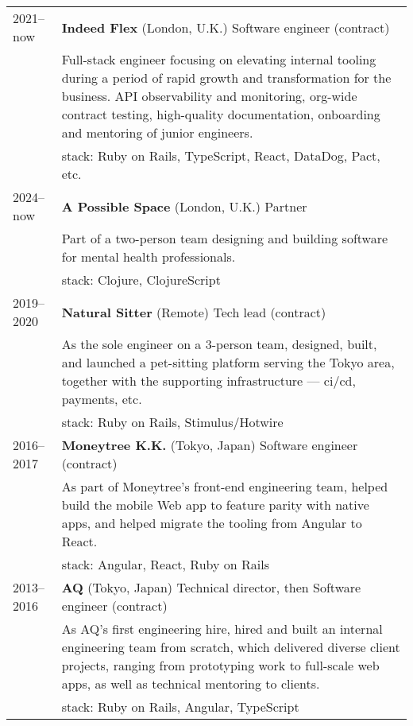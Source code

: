 \documentclass[a4paper,11pt]{article}
\def\companystrut{\rule{0pt}{1.2\normalbaselineskip}}
\def\descriptionstrut{\rule{0pt}{0.9\normalbaselineskip}}
\begin{document}
\begin{tabular}{ p{4.5em} p{41.5em} }
  2021–now & \textbf{Indeed Flex} (London, U.K.) Software engineer (contract)\\
           & \descriptionstrut Full-stack engineer focusing on elevating internal tooling
             during a period of rapid growth and transformation for the
             business. API observability and monitoring, org-wide contract testing,
             high-quality documentation, onboarding and mentoring of junior engineers.\\
           & {\sc stack:} Ruby on Rails, TypeScript, React, DataDog, Pact, etc. \\

  2024–now\companystrut & \textbf{A Possible Space} (London, U.K.) Partner\\
           & \descriptionstrut Part of a two-person team designing and building software
             for mental health professionals.\\
           & {\sc stack:} Clojure, ClojureScript \\

  2019–2020\companystrut & \textbf{Natural Sitter} (Remote) Tech lead (contract)\\
           & \descriptionstrut As the sole engineer on a 3-person team, designed, built,
             and launched a pet-sitting platform serving the Tokyo area, together with the
             supporting infrastructure — {\sc ci/cd}, payments, etc.\\
           & {\sc stack:} Ruby on Rails, Stimulus/Hotwire\\

  2016–2017\companystrut & \textbf{Moneytree K.K.} (Tokyo, Japan) Software engineer (contract)\\
           & \descriptionstrut As part of Moneytree’s front-end engineering team, helped
             build the mobile Web app to feature parity with native apps, and helped migrate
             the tooling from Angular to React.\\
           & {\sc stack:} Angular, React, Ruby on Rails\\

  2013–2016\companystrut & \textbf{AQ} (Tokyo, Japan) Technical director, {\sc then}
                           Software engineer (contract)\\
           & \descriptionstrut As AQ’s first engineering hire, hired and built an internal
             engineering team from scratch, which delivered diverse client projects, ranging from prototyping work to full-scale web apps, as well as technical mentoring to clients.\\
           & {\sc stack:} Ruby on Rails, Angular, TypeScript\\


\end{tabular}
\end{document}
